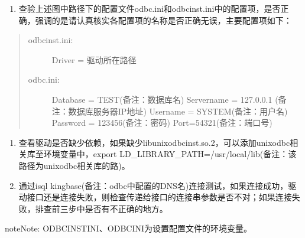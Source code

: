 \documentclass[letterpaper,10pt,english]{sphinxmanual}
\begin{document}
\begin{figure}[htbp]
\centering

\noindent{}
\end{figure}
\begin{enumerate}
%
\setcounter{enumi}{1}
\item {} 
查验上述图中路径下的配置文件odbc.ini和odbcinst.ini中的配置项，是否正确，强调的是请认真核实各配置项的名称是否正确无误，主要配置项如下：

\end{enumerate}
\begin{quote}
\begin{description}
\item[{odbcinst.ini:}] \leavevmode
Driver = 驱动所在路径

\item[{odbc.ini:}] \leavevmode
Database = TEST(备注：数据库名)
Servername = 127.0.0.1 (备注：数据库服务器IP地址)
Username = SYSTEM(备注：用户名)
Password = 123456(备注：密码)
Port=54321(备注：端口号)

\end{description}
\end{quote}
\begin{enumerate}
%
\setcounter{enumi}{2}
\item {} 
查看驱动是否缺少依赖，如果缺少libunixodbcinst.so.2，可以添加unixodbc相关库至环境变量中，export LD\_LIBRARY\_PATH=/usr/local/lib(备注：该路径为unixodbc相关库的路)。

\item {} 
通过isql kingbase(备注：odbc中配置的DNS名)连接测试，如果连接成功，驱动接口还是连接失败，则检查传递给接口的连接串参数是否不对；如果连接失败，排查前三步中是否有不正确的地方。

\end{enumerate}

\begin{sphinxadmonition}{note}{Note:}
ODBCINSTINI、ODBCINI为设置配置文件的环境变量。
\end{sphinxadmonition}
\end{document}
